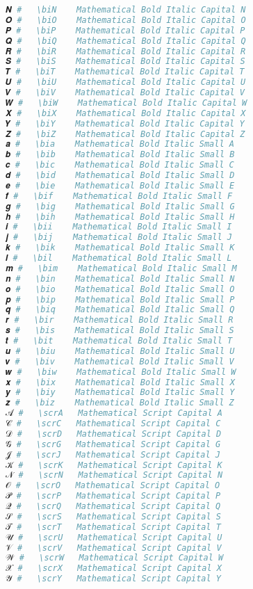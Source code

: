 \begin{lstlisting}[language=Julia, style=julia]
𝑵 #   \biN    Mathematical Bold Italic Capital N
𝑶 #   \biO    Mathematical Bold Italic Capital O
𝑷 #   \biP    Mathematical Bold Italic Capital P
𝑸 #   \biQ    Mathematical Bold Italic Capital Q
𝑹 #   \biR    Mathematical Bold Italic Capital R
𝑺 #   \biS    Mathematical Bold Italic Capital S
𝑻 #   \biT    Mathematical Bold Italic Capital T
𝑼 #   \biU    Mathematical Bold Italic Capital U
𝑽 #   \biV    Mathematical Bold Italic Capital V
𝑾 #   \biW    Mathematical Bold Italic Capital W
𝑿 #   \biX    Mathematical Bold Italic Capital X
𝒀 #   \biY    Mathematical Bold Italic Capital Y
𝒁 #   \biZ    Mathematical Bold Italic Capital Z
𝒂 #   \bia    Mathematical Bold Italic Small A
𝒃 #   \bib    Mathematical Bold Italic Small B
𝒄 #   \bic    Mathematical Bold Italic Small C
𝒅 #   \bid    Mathematical Bold Italic Small D
𝒆 #   \bie    Mathematical Bold Italic Small E
𝒇 #   \bif    Mathematical Bold Italic Small F
𝒈 #   \big    Mathematical Bold Italic Small G
𝒉 #   \bih    Mathematical Bold Italic Small H
𝒊 #   \bii    Mathematical Bold Italic Small I
𝒋 #   \bij    Mathematical Bold Italic Small J
𝒌 #   \bik    Mathematical Bold Italic Small K
𝒍 #   \bil    Mathematical Bold Italic Small L
𝒎 #   \bim    Mathematical Bold Italic Small M
𝒏 #   \bin    Mathematical Bold Italic Small N
𝒐 #   \bio    Mathematical Bold Italic Small O
𝒑 #   \bip    Mathematical Bold Italic Small P
𝒒 #   \biq    Mathematical Bold Italic Small Q
𝒓 #   \bir    Mathematical Bold Italic Small R
𝒔 #   \bis    Mathematical Bold Italic Small S
𝒕 #   \bit    Mathematical Bold Italic Small T
𝒖 #   \biu    Mathematical Bold Italic Small U
𝒗 #   \biv    Mathematical Bold Italic Small V
𝒘 #   \biw    Mathematical Bold Italic Small W
𝒙 #   \bix    Mathematical Bold Italic Small X
𝒚 #   \biy    Mathematical Bold Italic Small Y
𝒛 #   \biz    Mathematical Bold Italic Small Z
𝒜 #   \scrA   Mathematical Script Capital A
𝒞 #   \scrC   Mathematical Script Capital C
𝒟 #   \scrD   Mathematical Script Capital D
𝒢 #   \scrG   Mathematical Script Capital G
𝒥 #   \scrJ   Mathematical Script Capital J
𝒦 #   \scrK   Mathematical Script Capital K
𝒩 #   \scrN   Mathematical Script Capital N
𝒪 #   \scrO   Mathematical Script Capital O
𝒫 #   \scrP   Mathematical Script Capital P
𝒬 #   \scrQ   Mathematical Script Capital Q
𝒮 #   \scrS   Mathematical Script Capital S
𝒯 #   \scrT   Mathematical Script Capital T
𝒰 #   \scrU   Mathematical Script Capital U
𝒱 #   \scrV   Mathematical Script Capital V
𝒲 #   \scrW   Mathematical Script Capital W
𝒳 #   \scrX   Mathematical Script Capital X
𝒴 #   \scrY   Mathematical Script Capital Y

\end{lstlisting}
